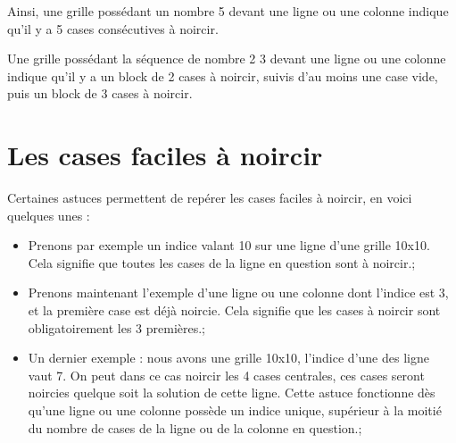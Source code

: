 \documentclass[a4paper, 12pt]{report}
\begin{document}
	        Ainsi, une grille possédant un nombre 5 devant une ligne ou une colonne indique qu'il y a 5 cases consécutives à noircir.
	        
	        Une grille possédant la séquence de nombre 2 3 devant une ligne ou une colonne indique qu'il y a un block de 2 cases à noircir, suivis d'au moins une case vide, puis un block de 3 cases à noircir.
	  
	       

		\section{Les cases faciles à noircir}

            Certaines astuces permettent de repérer les cases faciles à noircir, en voici quelques unes :
            \begin{itemize}
                \item Prenons par exemple un indice valant 10 sur une ligne d'une grille 10x10. Cela signifie que toutes les cases de la ligne en question sont à noircir.;
                \item Prenons maintenant l'exemple d'une ligne ou une colonne dont l'indice est 3, et la première case est déjà noircie. Cela signifie que les cases à noircir sont obligatoirement les 3 premières.;
                \item Un dernier exemple : nous avons une grille 10x10, l'indice d'une des ligne vaut 7. On peut dans ce cas noircir les 4 cases centrales, ces cases seront noircies quelque soit la solution de cette ligne. Cette astuce fonctionne dès qu'une ligne ou une colonne possède un indice unique, supérieur à la moitié du nombre de cases de la ligne ou de la colonne en question.;
            \end{itemize}
\end{document}
